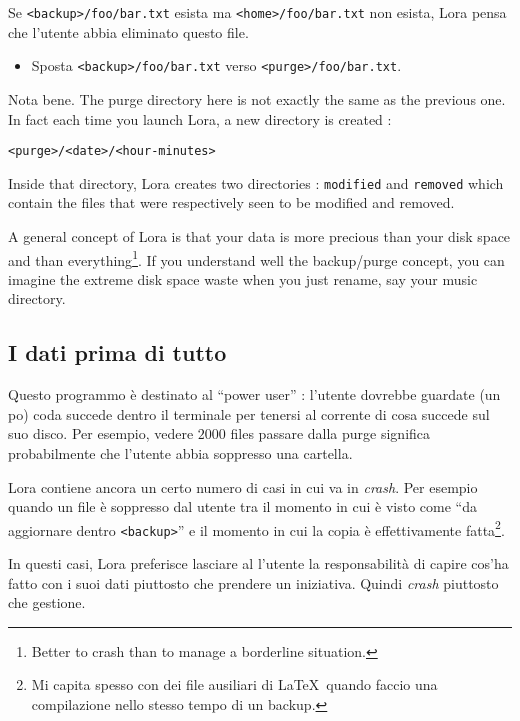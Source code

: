 \documentclass[a4paper,12pt]{article}
\newcommand{\info}[1]{\texttt{#1}}
\begin{document}
Se \info{<backup>/foo/bar.txt} esista ma \info{<home>/foo/bar.txt} non esista, Lora pensa che l'utente abbia eliminato questo file.
\begin{itemize}
    \item 
        Sposta \info{<backup>/foo/bar.txt} verso \info{<purge>/foo/bar.txt}.
\end{itemize}

Nota bene. The purge directory here is not exactly the same as the previous one. In fact each time you launch Lora, a new directory is created :
\begin{center}
    \info{<purge>/<date>/<hour-minutes>}
\end{center}
Inside that directory, Lora creates two directories : \info{modified} and \info{removed} which contain the files that were respectively seen to be modified and removed.

A general concept of Lora is that your data is more precious than your disk space and than everything\footnote{Better to crash than to manage a borderline situation.}. If you understand well the backup/purge concept, you can imagine the extreme disk space waste when you just rename, say your music directory.

\subsection{I dati prima di tutto}

Questo programmo è destinato al ``power user'' : l'utente dovrebbe guardate (un po) coda succede dentro il terminale per tenersi al corrente di cosa succede sul suo disco. Per esempio, vedere \( 2000\) files passare dalla purge significa probabilmente che l'utente abbia soppresso una cartella.

Lora contiene ancora un certo numero di casi in cui va in \emph{crash}. Per esempio quando un file è soppresso dal utente tra il momento in cui è visto come ``da aggiornare dentro \info{<backup>}'' e il momento in cui la copia è effettivamente fatta\footnote{Mi capita spesso con dei file ausiliari di \LaTeX\ quando faccio una compilazione nello stesso tempo di un backup.}.

In questi casi, Lora preferisce lasciare al l'utente la responsabilità di capire cos'ha fatto con i suoi dati piuttosto che prendere un iniziativa. Quindi \emph{crash} piuttosto che gestione.
\end{document}
